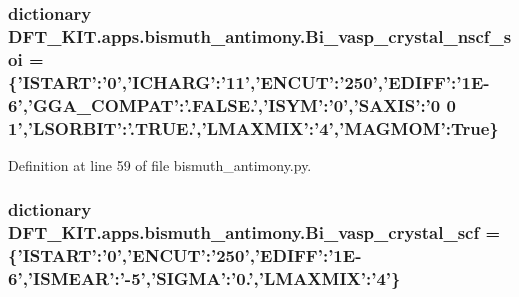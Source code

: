 \hypertarget{namespace_d_f_t___k_i_t_1_1apps_1_1bismuth__antimony_a44bfb7c33246a8a0aba68758b5fa94fa}{
\subsubsection[{Bi\+\_\+vasp\+\_\+crystal\+\_\+nscf\+\_\+soi}]{\setlength{\rightskip}{0pt plus 5cm}dictionary D\+F\+T\+\_\+\+K\+I\+T.\+apps.\+bismuth\+\_\+antimony.\+Bi\+\_\+vasp\+\_\+crystal\+\_\+nscf\+\_\+soi = \{'I\+S\+T\+A\+R\+T'\+:'0','I\+C\+H\+A\+R\+G'\+:'11','E\+N\+C\+U\+T'\+:'250','E\+D\+I\+F\+F'\+:'1\+E-\/6','\+G\+G\+A\+\_\+\+C\+O\+M\+P\+A\+T'\+:'.\+F\+A\+L\+S\+E.','\+I\+S\+Y\+M'\+:'0','\+S\+A\+X\+I\+S'\+:'0 0 1','\+L\+S\+O\+R\+B\+I\+T'\+:'.\+T\+R\+U\+E.','\+L\+M\+A\+X\+M\+I\+X'\+:'4','\+M\+A\+G\+M\+O\+M'\+:\+True\}}}\label{namespace_d_f_t___k_i_t_1_1apps_1_1bismuth__antimony_a44bfb7c33246a8a0aba68758b5fa94fa}


Definition at line 59 of file bismuth\+\_\+antimony.\+py.

\hypertarget{namespace_d_f_t___k_i_t_1_1apps_1_1bismuth__antimony_ab475abbbc15cd01fa76531119b87d038}{
\subsubsection[{Bi\+\_\+vasp\+\_\+crystal\+\_\+scf}]{\setlength{\rightskip}{0pt plus 5cm}dictionary D\+F\+T\+\_\+\+K\+I\+T.\+apps.\+bismuth\+\_\+antimony.\+Bi\+\_\+vasp\+\_\+crystal\+\_\+scf = \{'I\+S\+T\+A\+R\+T'\+:'0','E\+N\+C\+U\+T'\+:'250','E\+D\+I\+F\+F'\+:'1\+E-\/6','\+I\+S\+M\+E\+A\+R'\+:'-\/5','\+S\+I\+G\+M\+A'\+:'0.','\+L\+M\+A\+X\+M\+I\+X'\+:'4'\}}}\label{namespace_d_f_t___k_i_t_1_1apps_1_1bismuth__antimony_ab475abbbc15cd01fa76531119b87d038}


